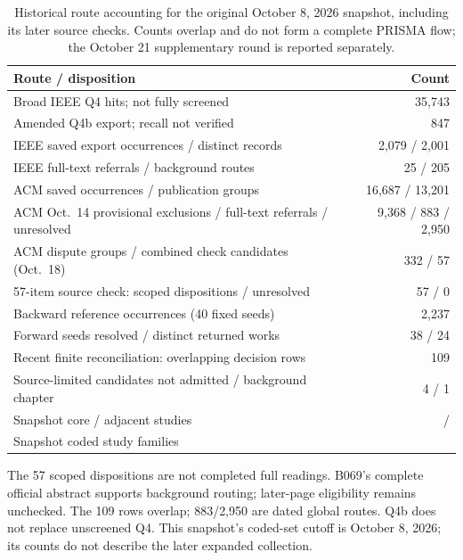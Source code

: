 \begin{table}[htbp]
\centering\small
\caption{Historical route accounting for the original October 8, 2026 snapshot, including its later source checks. Counts overlap and do not form a complete PRISMA flow; the October 21 supplementary round is reported separately.}
\label{tab:selection-flow}
\begin{tabularx}{\columnwidth}{@{}Yr@{}}
\toprule
Route / disposition & Count\\
\midrule
Broad IEEE Q4 hits; not fully screened & 35,743\\
Amended Q4b export; recall not verified & 847\\
IEEE saved export occurrences / distinct records & 2,079 / 2,001\\
IEEE full-text referrals / background routes & 25 / 205\\
ACM saved occurrences / publication groups & 16,687 / 13,201\\
ACM Oct.\ 14 provisional exclusions / full-text referrals / unresolved & 9,368 / 883 / 2,950\\
ACM dispute groups / combined check candidates (Oct.\ 18) & 332 / 57\\
57-item source check: scoped dispositions / unresolved & 57 / 0\\
Backward reference occurrences (40 fixed seeds) & 2,237\\
Forward seeds resolved / distinct returned works & 38 / 24\\
Recent finite reconciliation: overlapping decision rows & 109\\
Source-limited candidates not admitted / background chapter & 4 / 1\\
Snapshot core / adjacent studies & \SnapshotCore{} / \SnapshotAdjacent{}\\
Snapshot coded study families & \SnapshotN{}\\
\bottomrule
\end{tabularx}
\par\smallskip\footnotesize The 57 scoped dispositions are not completed full readings. B069's complete official abstract supports background routing; later-page eligibility remains unchecked. The 109 rows overlap; 883/2,950 are dated global routes. Q4b does not replace unscreened Q4. This snapshot's coded-set cutoff is October 8, 2026; its counts do not describe the later expanded collection.
\end{table}
